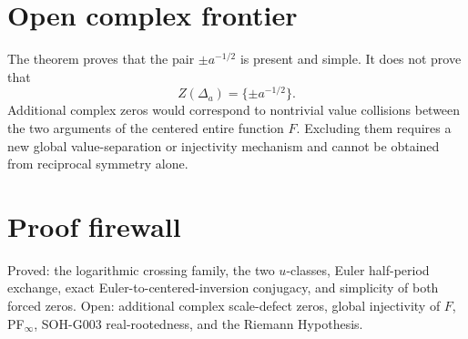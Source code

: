 \section{Open complex frontier}

The theorem proves that the pair \(\pm a^{-1/2}\) is present and simple. It does not prove that
\[
Z(\Delta_a)=\{\pm a^{-1/2}\}.
\]
Additional complex zeros would correspond to nontrivial value collisions between the two arguments of the centered entire function \(F\). Excluding them requires a new global value-separation or injectivity mechanism and cannot be obtained from reciprocal symmetry alone.

\section{Proof firewall}

Proved: the logarithmic crossing family, the two \(u\)-classes, Euler half-period exchange, exact Euler-to-centered-inversion conjugacy, and simplicity of both forced zeros. Open: additional complex scale-defect zeros, global injectivity of \(F\), PF\(_\infty\), SOH-G003 real-rootedness, and the Riemann Hypothesis.
